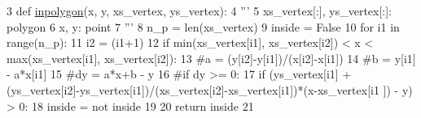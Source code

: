 \begin{DoxyCode}
3 \textcolor{keyword}{def }\hyperlink{namespacecmd__utilities_a016d198d084cbddc117765f2db6169db}{inpolygon}(x, y, xs\_vertex, ys\_vertex):
4     \textcolor{stringliteral}{''' }
5 \textcolor{stringliteral}{    xs\_vertex[:], ys\_vertex[:]: polygon}
6 \textcolor{stringliteral}{    x, y: point}
7 \textcolor{stringliteral}{    '''}     
8     n\_p = len(xs\_vertex)
9     inside = \textcolor{keyword}{False}
10     \textcolor{keywordflow}{for} i1 \textcolor{keywordflow}{in} range(n\_p): 
11         i2 = (i1+1)%
12         \textcolor{keywordflow}{if} min(xs\_vertex[i1], xs\_vertex[i2]) < x < max(xs\_vertex[i1], xs\_vertex[i2]):
13             \textcolor{comment}{#a = (y[i2]-y[i1])/(x[i2]-x[i1])}
14             \textcolor{comment}{#b = y[i1] - a*x[i1]}
15             \textcolor{comment}{#dy = a*x+b - y}
16             \textcolor{comment}{#if dy >= 0:}
17             \textcolor{keywordflow}{if} (ys\_vertex[i1] + (ys\_vertex[i2]-ys\_vertex[i1])/(xs\_vertex[i2]-xs\_vertex[i1])*(x-xs\_vertex[i1
      ]) - y) > 0:
18                 inside = \textcolor{keywordflow}{not} inside
19 
20     \textcolor{keywordflow}{return} inside
21 
\end{DoxyCode}
